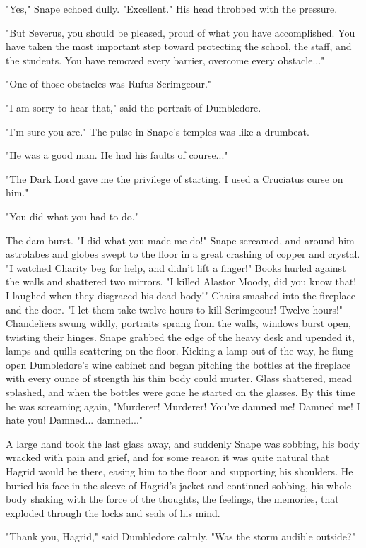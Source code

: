 "Yes," Snape echoed dully. "Excellent." His head throbbed with the pressure.

"But Severus, you should be pleased, proud of what you have accomplished. You have taken the most important step toward protecting the school, the staff, and the students. You have removed every barrier, overcome every obstacle..."

"One of those obstacles was Rufus Scrimgeour."

"I am sorry to hear that," said the portrait of Dumbledore.

"I'm sure you are." The pulse in Snape's temples was like a drumbeat.

"He was a good man. He had his faults of course..."

"The Dark Lord gave me the privilege of starting. I used a Cruciatus curse on him."

"You did what you had to do."

The dam burst. "I did what you made me do!" Snape screamed, and around him astrolabes and globes swept to the floor in a great crashing of copper and crystal. "I watched Charity beg for help, and didn't lift a finger!" Books hurled against the walls and shattered two mirrors. "I killed Alastor Moody, did you know that! I laughed when they disgraced his dead body!" Chairs smashed into the fireplace and the door. "I let them take twelve hours to kill Scrimgeour! Twelve hours!" Chandeliers swung wildly, portraits sprang from the walls, windows burst open, twisting their hinges. Snape grabbed the edge of the heavy desk and upended it, lamps and quills scattering on the floor. Kicking a lamp out of the way, he flung open Dumbledore's wine cabinet and began pitching the bottles at the fireplace with every ounce of strength his thin body could muster. Glass shattered, mead splashed, and when the bottles were gone he started on the glasses. By this time he was screaming again, "Murderer! Murderer! You've damned me! Damned me! I hate you! Damned... damned..."

A large hand took the last glass away, and suddenly Snape was sobbing, his body wracked with pain and grief, and for some reason it was quite natural that Hagrid would be there, easing him to the floor and supporting his shoulders. He buried his face in the sleeve of Hagrid's jacket and continued sobbing, his whole body shaking with the force of the thoughts, the feelings, the memories, that exploded through the locks and seals of his mind.

"Thank you, Hagrid," said Dumbledore calmly. "Was the storm audible outside?"

